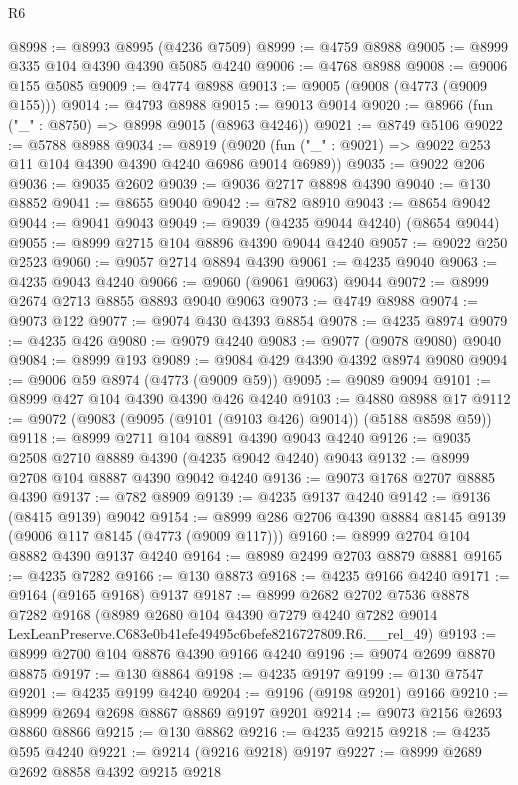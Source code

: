 \begin{lexlean}{R6}
\begin{coremodule}
@8998 := @8993 @8995 (@4236 @7509)
@8999 := @4759 @8988
@9005 := @8999 @335 @104 @4390 @4390 @5085 @4240
@9006 := @4768 @8988
@9008 := @9006 @155 @5085
@9009 := @4774 @8988
@9013 := @9005 (@9008 (@4773 (@9009 @155)))
@9014 := @4793 @8988
@9015 := @9013 @9014
@9020 := @8966 (fun ("_" : @8750) => @8998 @9015 (@8963 @4246))
@9021 := @8749 @5106
@9022 := @5788 @8988
@9034 := @8919
    (@9020 (fun ("_" : @9021) => @9022 @253 @11 @104 @4390 @4390 @4240 @6986 @9014 @6989))
@9035 := @9022 @206
@9036 := @9035 @2602
@9039 := @9036 @2717 @8898 @4390
@9040 := @130 @8852
@9041 := @8655 @9040
@9042 := @782 @8910
@9043 := @8654 @9042
@9044 := @9041 @9043
@9049 := @9039 (@4235 @9044 @4240) (@8654 @9044)
@9055 := @8999 @2715 @104 @8896 @4390 @9044 @4240
@9057 := @9022 @250 @2523
@9060 := @9057 @2714 @8894 @4390
@9061 := @4235 @9040
@9063 := @4235 @9043 @4240
@9066 := @9060 (@9061 @9063) @9044
@9072 := @8999 @2674 @2713 @8855 @8893 @9040 @9063
@9073 := @4749 @8988
@9074 := @9073 @122
@9077 := @9074 @430 @4393 @8854
@9078 := @4235 @8974
@9079 := @4235 @426
@9080 := @9079 @4240
@9083 := @9077 (@9078 @9080) @9040
@9084 := @8999 @193
@9089 := @9084 @429 @4390 @4392 @8974 @9080
@9094 := @9006 @59 @8974 (@4773 (@9009 @59))
@9095 := @9089 @9094
@9101 := @8999 @427 @104 @4390 @4390 @426 @4240
@9103 := @4880 @8988 @17
@9112 := @9072 (@9083 (@9095 (@9101 (@9103 @426) @9014)) (@5188 @8598 @59))
@9118 := @8999 @2711 @104 @8891 @4390 @9043 @4240
@9126 := @9035 @2508 @2710 @8889 @4390 (@4235 @9042 @4240) @9043
@9132 := @8999 @2708 @104 @8887 @4390 @9042 @4240
@9136 := @9073 @1768 @2707 @8885 @4390
@9137 := @782 @8909
@9139 := @4235 @9137 @4240
@9142 := @9136 (@8415 @9139) @9042
@9154 := @8999 @286 @2706 @4390 @8884 @8145 @9139 (@9006 @117 @8145 (@4773 (@9009 @117)))
@9160 := @8999 @2704 @104 @8882 @4390 @9137 @4240
@9164 := @8989 @2499 @2703 @8879 @8881
@9165 := @4235 @7282
@9166 := @130 @8873
@9168 := @4235 @9166 @4240
@9171 := @9164 (@9165 @9168) @9137
@9187 := @8999
    @2682
    @2702
    @7536
    @8878
    @7282
    @9168
    (@8989
      @2680
      @104
      @4390
      @7279
      @4240
      @7282
      @9014
      LexLeanPreserve.C683e0b41efe49495c6befe8216727809.R6.__rel_49)
@9193 := @8999 @2700 @104 @8876 @4390 @9166 @4240
@9196 := @9074 @2699 @8870 @8875
@9197 := @130 @8864
@9198 := @4235 @9197
@9199 := @130 @7547
@9201 := @4235 @9199 @4240
@9204 := @9196 (@9198 @9201) @9166
@9210 := @8999 @2694 @2698 @8867 @8869 @9197 @9201
@9214 := @9073 @2156 @2693 @8860 @8866
@9215 := @130 @8862
@9216 := @4235 @9215
@9218 := @4235 @595 @4240
@9221 := @9214 (@9216 @9218) @9197
@9227 := @8999 @2689 @2692 @8858 @4392 @9215 @9218

\end{coremodule}
\end{lexlean}
